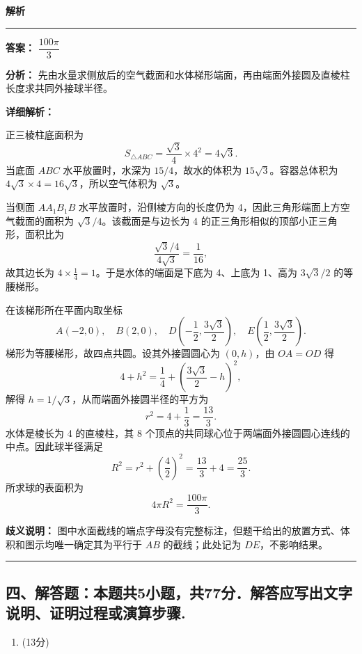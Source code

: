 \documentclass[UTF8,12pt,a4paper]{ctexart}
\renewcommand{\labelenumi}{\arabic{enumi}.}
\newenvironment{examSolutionBox}{%
  \par\medskip\begingroup
  \setlength{\leftskip}{1.0em}\setlength{\rightskip}{0.9em}%
  \noindent\textcolor{SolutionTeal}{\bfseries\large 解析}\par
  \smallskip\noindent\textcolor{SolutionRule}{\rule{\dimexpr\linewidth-\leftskip-\rightskip\relax}{0.8pt}}\par
  \smallskip\color{SolutionInk}%
}{%
  \par\smallskip\noindent\textcolor{SolutionRule}{\rule{\dimexpr\linewidth-\leftskip-\rightskip\relax}{0.8pt}}\par
  \endgroup\medskip
}
\providecommand{\tightlist}{%
  \setlength{\itemsep}{0pt}\setlength{\parskip}{0pt}}
\begin{document}
\begin{examSolutionBox}

\textbf{答案：} \(\dfrac{100\pi}{3}\)

\textbf{分析：} 先由水量求侧放后的空气截面和水体梯形端面，再由端面外接圆及直棱柱长度求共同外接球半径。

\textbf{详细解析：}

正三棱柱底面积为
\[
   S_{\triangle ABC}=\frac{\sqrt3}{4}\times4^2=4\sqrt3.
   \]
当底面 \(ABC\) 水平放置时，水深为 \(15/4\)，故水的体积为 \(15\sqrt3\)。容器总体积为 \(4\sqrt3\times4=16\sqrt3\)，所以空气体积为 \(\sqrt3\)。

当侧面 \(AA_1B_1B\) 水平放置时，沿侧棱方向的长度仍为 4，因此三角形端面上方空气截面的面积为 \(\sqrt3/4\)。该截面是与边长为 4 的正三角形相似的顶部小正三角形，面积比为
\[
   \frac{\sqrt3/4}{4\sqrt3}=\frac1{16},
   \]
故其边长为 \(4\times\frac14=1\)。于是水体的端面是下底为 4、上底为 1、高为 \(3\sqrt3/2\) 的等腰梯形。

在该梯形所在平面内取坐标
\[
   A(-2,0),\quad B(2,0),\quad
   D\left(-\frac12,\frac{3\sqrt3}{2}\right),\quad
   E\left(\frac12,\frac{3\sqrt3}{2}\right).
   \]
梯形为等腰梯形，故四点共圆。设其外接圆圆心为 \((0,h)\)，由 \(OA=OD\) 得
\[
   4+h^2
   =\frac14+\left(\frac{3\sqrt3}{2}-h\right)^2,
   \]
解得 \(h=1/\sqrt3\)，从而端面外接圆半径的平方为
\[
   r^2=4+\frac13=\frac{13}{3}.
   \]
水体是棱长为 4 的直棱柱，其 8 个顶点的共同球心位于两端面外接圆圆心连线的中点。因此球半径满足
\[
   R^2=r^2+\left(\frac42\right)^2
   =\frac{13}{3}+4=\frac{25}{3}.
   \]
所求球的表面积为
\[
   4\pi R^2=\frac{100\pi}{3}.
   \]

\textbf{歧义说明：} 图中水面截线的端点字母没有完整标注，但题干给出的放置方式、体积和图示均唯一确定其为平行于 \(AB\) 的截线；此处记为 \(DE\)，不影响结果。

\end{examSolutionBox}

\subsection{四、解答题：本题共5小题，共77分．解答应写出文字说明、证明过程或演算步骤.}\label{ux56dbux89e3ux7b54ux9898ux672cux9898ux51715ux5c0fux9898ux517177ux5206ux89e3ux7b54ux5e94ux5199ux51faux6587ux5b57ux8bf4ux660eux8bc1ux660eux8fc7ux7a0bux6216ux6f14ux7b97ux6b65ux9aa4.}

\begin{enumerate}
\def\labelenumi{\arabic{enumi}.}
\setcounter{enumi}{14}
\tightlist
\item
  (13分)
\end{enumerate}
\end{document}

